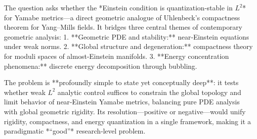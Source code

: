 The question asks whether the *Einstein condition is quantization‑stable in \(L^2\)* for Yamabe metrics—a direct geometric analogue of Uhlenbeck’s compactness theorem for Yang–Mills fields.  
It bridges three central themes of contemporary geometric analysis:  
1. **Geometric PDE and stability:** near‑Einstein equations under weak norms.  
2. **Global structure and degeneration:** compactness theory for moduli spaces of almost‑Einstein manifolds.  
3. **Energy concentration phenomena:** discrete energy decomposition through bubbling.  

The problem is **profoundly simple to state yet conceptually deep**: it tests whether weak \(L^2\) analytic control suffices to constrain the global topology and limit behavior of near‑Einstein Yamabe metrics, balancing pure PDE analysis with global geometric rigidity.  
Its resolution—positive or negative—would unify rigidity, compactness, and energy quantization in a single framework, making it a paradigmatic *“good”* research‑level problem.